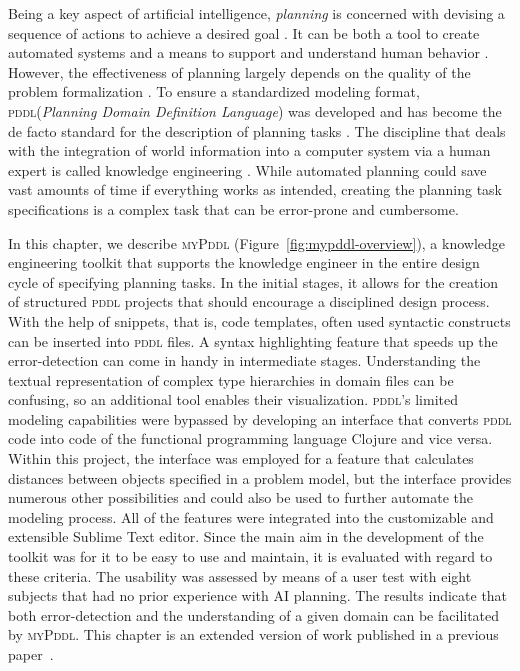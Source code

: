 \documentclass[runningheads]{llncs}
\newcommand{\mypddl}{\textsc{myPddl}\xspace}
\newcommand{\pddl}{\textsc{pddl}\xspace}
\begin{document}
Being a key aspect of artificial intelligence, \emph{planning} is
concerned with devising a sequence of actions to achieve a desired
goal \cite{helmert2008understanding}. It can be both a tool to create
automated systems and a means to support and understand human behavior
\cite{konar1999artificial}. However, the effectiveness of planning
largely depends on the quality of the problem formalization
\cite{shah2013knowledge,keps2014}. To ensure a standardized modeling
format, \pddl (\emph{Planning Domain Definition Language})
\cite{mcdermott1998pddl} was developed and has become the de facto
standard for the description of planning tasks
\cite{ilghami2005extension}. The discipline that deals with the
integration of world information into a computer system via a human
expert is called knowledge engineering \cite{feigenbaum1983fifth}.
While automated planning could save vast amounts of time if everything
works as intended, creating the planning task specifications is a
complex task that can be error-prone and cumbersome.

In this chapter, we describe \mypddl
(Figure~\ref{fig:mypddl-overview}), a knowledge engineering toolkit
that supports the knowledge engineer in the entire design cycle of
specifying planning tasks. In the initial stages, it allows for the
creation of structured \pddl projects that should encourage a
disciplined design process. With the help of snippets, that is, code
templates, often used syntactic constructs can be inserted into \pddl
files. A syntax highlighting feature that speeds up the
error-detection can come in handy in intermediate
stages. Understanding the textual representation of complex type
hierarchies in domain files can be confusing, so an additional tool
enables their visualization. \pddl's limited modeling capabilities
were bypassed by developing an interface that converts \pddl code into
code of the functional programming language Clojure
\cite{hickey2008clojure} and vice versa.  Within this project, the
interface was employed for a feature that calculates distances between
objects specified in a problem model, but the interface provides
numerous other possibilities and could also be used to further
automate the modeling process. All of the features were integrated
into the customizable and extensible Sublime Text \cite{sublimetext3}
editor. Since the main aim in the development of the toolkit was for
it to be easy to use and maintain, it is evaluated with regard to
these criteria. The usability was assessed by means of a user test
with eight subjects that had no prior experience with AI planning. The
results indicate that both error-detection and the understanding of a
given domain can be facilitated by \mypddl. This chapter is an
extended version of work published in a previous paper~\cite{StrKir2014:aai}.
\end{document}
